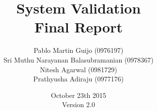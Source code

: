 \documentclass[10pt,a4paper]{article}
\begin{document}


\title{\Huge{\textbf{System Validation\\ Final Report\\[3cm]}}} %

\author{\LARGE{Pablo Martin Guijo (0976197)}\\
	\LARGE{Sri Muthu Narayanan Balasubramanian (0978367)}\\
	\LARGE{Nitesh Agarwal (0981729)}\\
	\LARGE{Prathyusha Adiraju (0977176)}\\[5cm]
	}

\date{\Large{October 23th 2015\\Version 2.0\\}}
\maketitle

\newpage
\tableofcontents
\newpage
\end{document}
